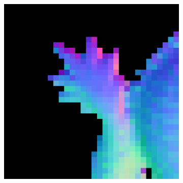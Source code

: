 \begin{figure}[H]
\begin{subfigure}[b]{0.18\linewidth}
	\end{subfigure}
	\begin{subfigure}[b]{0.18\linewidth}
		\includegraphics[width=\linewidth]{./Figures/trip_net_zoom_in/eval_7_12_-48_normal.png}
	\end{subfigure}
	

\end{figure}
